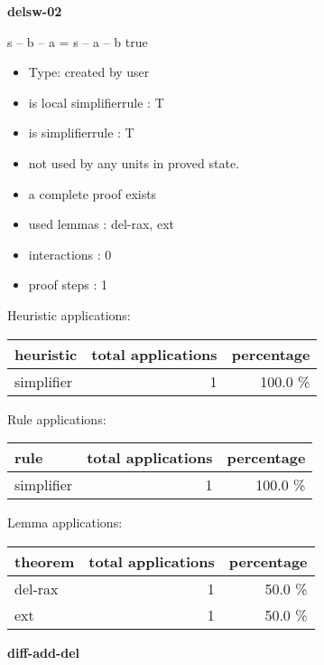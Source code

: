 \documentclass[a4paper]{article}
\begin{document}
{\LARGE\bf delsw-02}\label{lemma-delsw-02}

\medskip

 \Fol s -- b -- a = s -- a -- b \Equiv true

\begin{itemize}

\item Type: created by user

\item is local simplifierrule : T
\item is simplifierrule : T
\item not used by any units in proved state.
\item       a complete proof exists
\item       used lemmas  : del-rax, ext
\item       interactions : 0
\item       proof steps  : 1
\end{itemize}

\medskip


Heuristic applications:

\begin{supertabular}{l|r|r}
heuristic	& total applications & percentage \\ \hline
simplifier & 1 & 100.0 \% \\

\end{supertabular}

Rule applications:

\begin{supertabular}{l|r|r}
rule	        & total applications & percentage \\ \hline
simplifier & 1 & 100.0 \% \\

\end{supertabular}

Lemma applications:

\begin{supertabular}{l|r|r}
theorem	        & total applications & percentage \\ \hline
del-rax & 1 & 50.0 \% \\
ext & 1 & 50.0 \% \\

\end{supertabular}
\pagebreak

{\LARGE\bf diff-add-del}\label{lemma-diff-add-del}

\medskip
\end{document}
